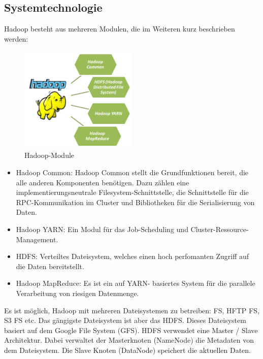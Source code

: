\subsection{Systemtechnologie}\label{hadooptech}
Hadoop besteht aus mehreren Modulen, die im Weiteren kurz beschrieben werden:

\begin{figure}[htbp] 
  \centering
     \includegraphics[width=0.5\textwidth]{images/06hadoop_modules.png}
  \caption{Hadoop-Module \cite{HaMo}}
  \label{fig: Hadoop-Module}
\end{figure}

\begin{itemize}
\item Hadoop Common: Hadoop Common stellt die Grundfunktionen bereit, die alle anderen Komponenten benötigen. Dazu zählen eine implementierungsneutrale Filesystem-Schnittstelle, die Schnittstelle für die \ac{RPC}-Kommunikation im Cluster und Bibliotheken für die Serialisierung von Daten.
\item Hadoop YARN: Ein Modul für das Job-Scheduling und Cluster-Ressource-Management.
\item \ac{HDFS}: Verteiltes Dateisystem, welches einen hoch perfomanten Zugriff auf die Daten bereitstellt.
\item Hadoop MapReduce: Es ist ein auf YARN- basiertes System für die parallele Verarbeitung von riesigen Datenmenge.
\end{itemize}
Es ist möglich, Hadoop mit mehreren Dateisystemen zu betreiben: FS, HFTP FS, S3 FS etc. Das gängigste Dateisystem ist aber das \ac{HDFS}. Dieses Dateisystem basiert auf dem Google File System (\ac{GFS}). 
HDFS verwendet eine Master / Slave Architektur. Dabei verwaltet der Masterknoten (NameNode) die Metadaten von dem Dateisystem. Die Slave Knoten (DataNode) speichert die aktuellen Daten.

